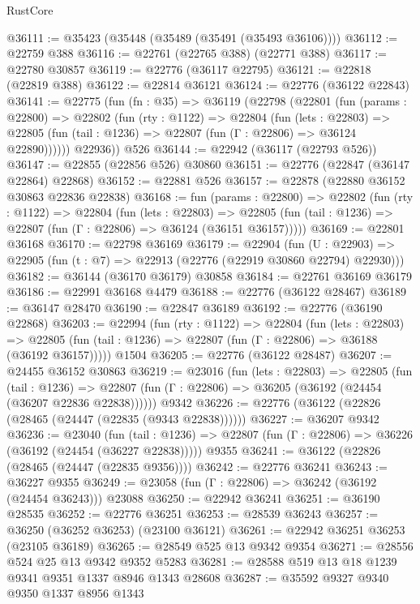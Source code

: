 \begin{lexlean}{RustCore}
\begin{coremodule}
@36111 := @35423 (@35448 (@35489 (@35491 (@35493 @36106))))
@36112 := @22759 @388
@36116 := @22761 (@22765 @388) (@22771 @388)
@36117 := @22780 @30857
@36119 := @22776 (@36117 @22795)
@36121 := @22818 (@22819 @388)
@36122 := @22814 @36121
@36124 := @22776 (@36122 @22843)
@36141 := @22775
    (fun (fn : @35) =>
    @36119
      (@22798
        (@22801
          (fun (params : @22800) =>
          @22802
            (fun (rty : @1122) =>
            @22804
              (fun (lets : @22803) =>
              @22805 (fun (tail : @1236) => @22807 (fun (Γ : @22806) => @36124 @22890))))))
        @22936))
    @526
@36144 := @22942 (@36117 (@22793 @526))
@36147 := @22855 (@22856 @526) @30860
@36151 := @22776 (@22847 (@36147 @22864) @22868)
@36152 := @22881 @526
@36157 := @22878 (@22880 @36152 @30863 @22836 @22838)
@36168 := fun (params : @22800) =>
  @22802
    (fun (rty : @1122) =>
    @22804
      (fun (lets : @22803) =>
      @22805 (fun (tail : @1236) => @22807 (fun (Γ : @22806) => @36124 (@36151 @36157)))))
@36169 := @22801 @36168
@36170 := @22798 @36169
@36179 := @22904
    (fun (U : @22903) => @22905 (fun (t : @7) => @22913 (@22776 (@22919 @30860 @22794) @22930)))
@36182 := @36144 (@36170 @36179) @30858
@36184 := @22761 @36169 @36179
@36186 := @22991 @36168 @4479
@36188 := @22776 (@36122 @28467)
@36189 := @36147 @28470
@36190 := @22847 @36189
@36192 := @22776 (@36190 @22868)
@36203 := @22994
    (fun (rty : @1122) =>
    @22804
      (fun (lets : @22803) =>
      @22805 (fun (tail : @1236) => @22807 (fun (Γ : @22806) => @36188 (@36192 @36157)))))
    @1504
@36205 := @22776 (@36122 @28487)
@36207 := @24455 @36152 @30863
@36219 := @23016
    (fun (lets : @22803) =>
    @22805
      (fun (tail : @1236) =>
      @22807 (fun (Γ : @22806) => @36205 (@36192 (@24454 (@36207 @22836 @22838))))))
    @9342
@36226 := @22776 (@36122 (@22826 (@28465 (@24447 (@22835 (@9343 @22838))))))
@36227 := @36207 @9342
@36236 := @23040
    (fun (tail : @1236) => @22807 (fun (Γ : @22806) => @36226 (@36192 (@24454 (@36227 @22838)))))
    @9355
@36241 := @36122 (@22826 (@28465 (@24447 (@22835 @9356))))
@36242 := @22776 @36241
@36243 := @36227 @9355
@36249 := @23058 (fun (Γ : @22806) => @36242 (@36192 (@24454 @36243))) @23088
@36250 := @22942 @36241
@36251 := @36190 @28535
@36252 := @22776 @36251
@36253 := @28539 @36243
@36257 := @36250 (@36252 @36253) (@23100 @36121)
@36261 := @22942 @36251 @36253 (@23105 @36189)
@36265 := @28549 @525 @13 @9342 @9354
@36271 := @28556 @524 @25 @13 @9342 @9352 @5283
@36281 := @28588 @519 @13 @18 @1239 @9341 @9351 @1337 @8946 @1343 @28608
@36287 := @35592 @9327 @9340 @9350 @1337 @8956 @1343

\end{coremodule}
\end{lexlean}
